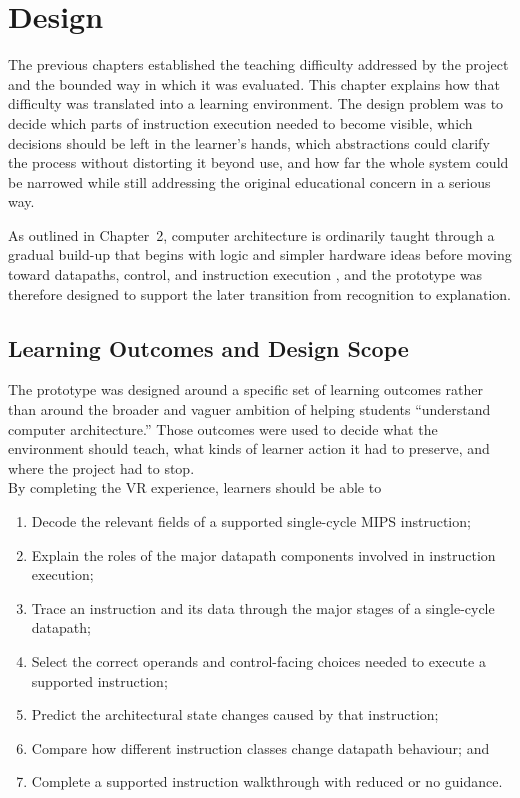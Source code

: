 \chapter{Design}

The previous chapters established the teaching difficulty addressed by the project and the bounded way in which it was evaluated. This chapter explains how that difficulty was translated into a learning environment. The design problem was to decide which parts of instruction execution needed to become visible, which decisions should be left in the learner's hands, which abstractions could clarify the process without distorting it beyond use, and how far the whole system could be narrowed while still addressing the original educational concern in a serious way.

As outlined in Chapter~2, computer architecture is ordinarily taught through a gradual build-up that begins with logic and simpler hardware ideas before moving toward datapaths, control, and instruction execution \cite{tcdComputerArchitectureI}, and the prototype was therefore designed to support the later transition from recognition to explanation.

\section{Learning Outcomes and Design Scope}

The prototype was designed around a specific set of learning outcomes rather than around the broader and vaguer ambition of helping students ``understand computer architecture.'' Those outcomes were used to decide what the environment should teach, what kinds of learner action it had to preserve, and where the project had to stop. \\
By completing the VR experience, learners should be able to

\begin{enumerate}
\item Decode the relevant fields of a supported single-cycle MIPS instruction;
\item Explain the roles of the major datapath components involved in instruction execution;
\item Trace an instruction and its data through the major stages of a single-cycle datapath;
\item Select the correct operands and control-facing choices needed to execute a supported instruction;
\item Predict the architectural state changes caused by that instruction;
\item Compare how different instruction classes change datapath behaviour; and
\item Complete a supported instruction walkthrough with reduced or no guidance.
\end{enumerate}

